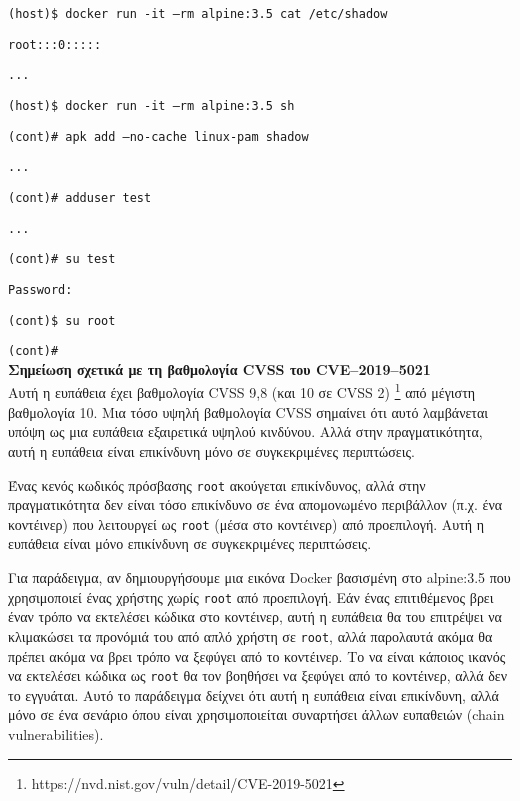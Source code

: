 \texttt{\textlatin{(host)\$ docker run -it --rm alpine:3.5 cat /etc/shadow}}

\texttt{\textlatin{root:::0:::::}}

\texttt{\textlatin{...}}

\texttt{\textlatin{(host)\$ docker run -it --rm alpine:3.5 sh}}

\texttt{\textlatin{(cont)\# apk add --no-cache linux-pam shadow}}

\texttt{\textlatin{...}}

\texttt{\textlatin{(cont)\# adduser test}}

\texttt{\textlatin{...}}

\texttt{\textlatin{(cont)\# su test}}

\texttt{\textlatin{Password:}}

\texttt{\textlatin{(cont)\$ su root}}

\texttt{\textlatin{(cont)\#}} \\

\textbf{Σημείωση σχετικά με τη βαθμολογία \textlatin{CVSS} του
\textlatin{CVE–2019–5021}} \\

Αυτή η ευπάθεια έχει βαθμολογία \textlatin{CVSS} 9,8 (και 10 σε
\textlatin{CVSS} 2)
\footnote{\textlatin{https://nvd.nist.gov/vuln/detail/CVE-2019-5021}} από
μέγιστη βαθμολογία 10. Μια τόσο υψηλή βαθμολογία \textlatin{CVSS} σημαίνει ότι
αυτό λαμβάνεται υπόψη ως μια ευπάθεια εξαιρετικά υψηλού κινδύνου. Αλλά στην
πραγματικότητα, αυτή η ευπάθεια είναι επικίνδυνη μόνο σε συγκεκριμένες
περιπτώσεις.

Ένας κενός κωδικός πρόσβασης \texttt{\textlatin{root}} ακούγεται επικίνδυνος,
αλλά στην πραγματικότητα δεν είναι τόσο επικίνδυνο σε ένα απομονωμένο περιβάλλον
(π.χ. ένα κοντέινερ) που λειτουργεί ως \texttt{\textlatin{root}} (μέσα στο
κοντέινερ) από προεπιλογή. Αυτή η ευπάθεια είναι μόνο επικίνδυνη σε
συγκεκριμένες περιπτώσεις.

Για παράδειγμα, αν δημιουργήσουμε μια εικόνα \textlatin{Docker} βασισμένη στο
\textlatin{alpine:3.5} που χρησιμοποιεί ένας χρήστης χωρίς
\texttt{\textlatin{root}} από προεπιλογή. Εάν ένας επιτιθέμενος βρει έναν τρόπο
να εκτελέσει κώδικα στο κοντέινερ, αυτή η ευπάθεια θα του επιτρέψει να
κλιμακώσει τα προνόμιά του από απλό χρήστη σε \texttt{\textlatin{root}}, αλλά
παρολαυτά ακόμα θα πρέπει ακόμα να βρει τρόπο να ξεφύγει από το κοντέινερ. Το να
είναι κάποιος ικανός να εκτελέσει κώδικα ως \texttt{\textlatin{root}} θα τον
βοηθήσει να ξεφύγει από το κοντέινερ, αλλά δεν το εγγυάται. Αυτό το παράδειγμα
δείχνει ότι αυτή η ευπάθεια είναι επικίνδυνη, αλλά μόνο σε ένα σενάριο όπου
είναι χρησιμοποιείται συναρτήσει άλλων ευπαθειών (\textlatin{chain
vulnerabilities}).

